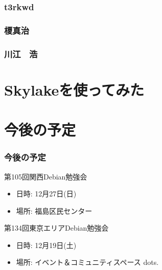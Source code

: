 \documentclass[cjk,dvipdfmx,10pt,compress,%
hyperref={bookmarks=true,bookmarksnumbered=true,bookmarksopen=false,%
colorlinks=false,%
pdftitle={第 104 回 関西 Debian 勉強会},%
pdfauthor={倉敷・のがた・佐々木・かわだ},%
pdfsubject={資料},%
}]{beamer}
\begin{document}
\begin{frame}
  \frametitle{ t3rkwd }
\end{frame}

\begin{frame}
  \frametitle{ 榎真治 }
\end{frame}

\begin{frame}
  \frametitle{ 川江　浩 }
\end{frame}


\section{Skylakeを使ってみた}


\section{今後の予定}
\begin{frame}[fragile]
\frametitle{今後の予定}

\begin{block}{第105回関西Debian勉強会}
  \begin{itemize}
  \item 日時: 12月27日(日)
  \item 場所: 福島区民センター
  \end{itemize}
\end{block}

\begin{block}{第134回東京エリアDebian勉強会}
  \begin{itemize}
  \item 日時: 12月19日(土)
  \item 場所: イベント＆コミュニティスペース dots.
  \end{itemize}
\end{block}

\end{frame}

\takahashi[50]{  }
\end{document}
